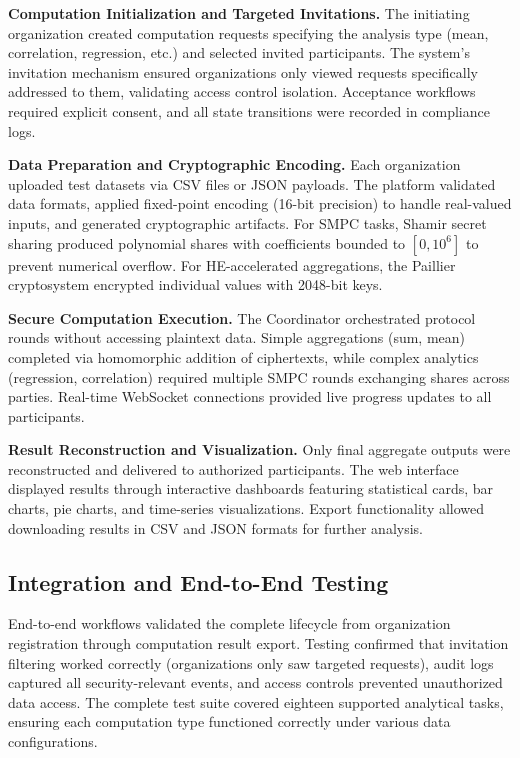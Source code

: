 \documentclass[conference]{IEEEtran}
\begin{document}
\textbf{Computation Initialization and Targeted Invitations.} The initiating organization created computation requests specifying the analysis type (mean, correlation, regression, etc.) and selected invited participants. The system's invitation mechanism ensured organizations only viewed requests specifically addressed to them, validating access control isolation. Acceptance workflows required explicit consent, and all state transitions were recorded in compliance logs.

\textbf{Data Preparation and Cryptographic Encoding.} Each organization uploaded test datasets via CSV files or JSON payloads. The platform validated data formats, applied fixed-point encoding (16-bit precision) to handle real-valued inputs, and generated cryptographic artifacts. For SMPC tasks, Shamir secret sharing produced polynomial shares with coefficients bounded to $[0, 10^6]$ to prevent numerical overflow. For HE-accelerated aggregations, the Paillier cryptosystem encrypted individual values with 2048-bit keys.

\textbf{Secure Computation Execution.} The Coordinator orchestrated protocol rounds without accessing plaintext data. Simple aggregations (sum, mean) completed via homomorphic addition of ciphertexts, while complex analytics (regression, correlation) required multiple SMPC rounds exchanging shares across parties. Real-time WebSocket connections provided live progress updates to all participants.

\textbf{Result Reconstruction and Visualization.} Only final aggregate outputs were reconstructed and delivered to authorized participants. The web interface displayed results through interactive dashboards featuring statistical cards, bar charts, pie charts, and time-series visualizations. Export functionality allowed downloading results in CSV and JSON formats for further analysis.

\subsection{Integration and End-to-End Testing}
End-to-end workflows validated the complete lifecycle from organization registration through computation result export. Testing confirmed that invitation filtering worked correctly (organizations only saw targeted requests), audit logs captured all security-relevant events, and access controls prevented unauthorized data access. The complete test suite covered eighteen supported analytical tasks, ensuring each computation type functioned correctly under various data configurations.
\end{document}
